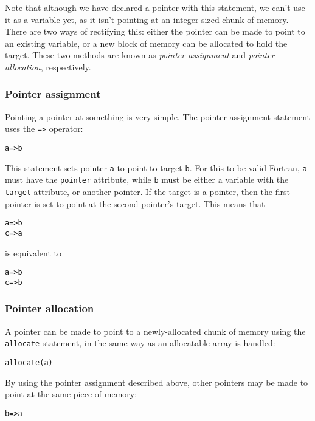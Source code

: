 Note that although we have declared a pointer with this statement, we can't
use it as a variable yet, as it isn't pointing at an integer-sized chunk of
memory. There are two ways of rectifying this: either the pointer can be made
to point to an existing variable, or a new block of memory
can be allocated to hold the target. These two methods are known as
\emph{pointer assignment} and \emph{pointer allocation}, respectively.
%
\subsubsection{Pointer assignment}
%
Pointing a pointer at something is very simple. The pointer assignment
statement uses the \texttt{=>} operator:
%
\begin{alltt}
    a => b
\end{alltt}
%
This statement sets pointer \texttt{a} to point to target \texttt{b}. For this
to be valid Fortran, \texttt{a} must have the \texttt{pointer} attribute,
while \texttt{b} must be either a variable with the \texttt{target} attribute,
or another pointer. If the target is a pointer, then the first pointer is set
to point at the second pointer's target. This means that
%
\begin{alltt}
    a => b
    c => a
\end{alltt}
%
is equivalent to
%
\begin{alltt}
    a => b
    c => b
\end{alltt}
%
\subsubsection{Pointer allocation}
%
A pointer can be made to point to a newly-allocated chunk of memory using the
\texttt{allocate} statement, in the same way as an allocatable array is
handled:
%
\begin{alltt}
    allocate(a)
\end{alltt}
%
By using the pointer assignment described above, other pointers may be made to
point at the same piece of memory:
%
\begin{alltt}
    b => a
\end{alltt}
%
